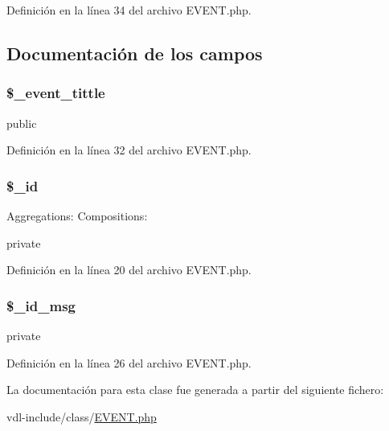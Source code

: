 Definición en la línea 34 del archivo E\-V\-E\-N\-T.\-php.



\subsection{Documentación de los campos}
\hypertarget{classEVENT_a2a136ab40c3109fff873d8e2d1e2d481}{
\subsubsection[{\$\-\_\-event\-\_\-tittle}]{\setlength{\rightskip}{0pt plus 5cm}\$\-\_\-event\-\_\-tittle}}\label{classEVENT_a2a136ab40c3109fff873d8e2d1e2d481}
public 

Definición en la línea 32 del archivo E\-V\-E\-N\-T.\-php.

\hypertarget{classEVENT_a64da16c4a1c7b2dc6784f6ef26341ed7}{
\subsubsection[{\$\-\_\-id}]{\setlength{\rightskip}{0pt plus 5cm}\$\-\_\-id\hspace{0.3cm}{\ttfamily [private]}}}\label{classEVENT_a64da16c4a1c7b2dc6784f6ef26341ed7}
Aggregations\-: Compositions\-:

private 

Definición en la línea 20 del archivo E\-V\-E\-N\-T.\-php.

\hypertarget{classEVENT_a63808e734406ff8eae9fc3dac25fca22}{
\subsubsection[{\$\-\_\-id\-\_\-msg}]{\setlength{\rightskip}{0pt plus 5cm}\$\-\_\-id\-\_\-msg\hspace{0.3cm}{\ttfamily [private]}}}\label{classEVENT_a63808e734406ff8eae9fc3dac25fca22}
private 

Definición en la línea 26 del archivo E\-V\-E\-N\-T.\-php.



La documentación para esta clase fue generada a partir del siguiente fichero\-:\begin{DoxyCompactItemize}
\item 
vdl-\/include/class/\hyperlink{EVENT_8php}{E\-V\-E\-N\-T.\-php}\end{DoxyCompactItemize}
